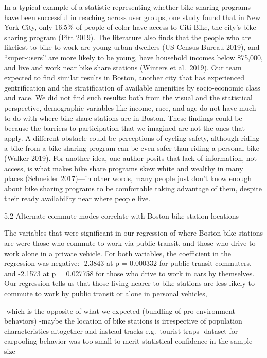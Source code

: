 \documentclass[
  12pt,
]{article}
\begin{document}
In a typical example of a statistic representing whether bike sharing
programs have been successful in reaching across user groups, one study
found that in New York City, only 16.5\% of people of color have access
to Citi Bike, the city's bike sharing program (Pitt 2019). The
literature also finds that the people who are likeliest to bike to work
are young urban dwellers (US Census Bureau 2019), and ``super-users''
are more likely to be young, have household incomes below \$75,000, and
live and work near bike share stations (Winters et al.~2019). Our team
expected to find similar results in Boston, another city that has
experienced gentrification and the stratification of available amenities
by socio-economic class and race. We did not find such results: both
from the visual and the statistical perspective, demographic variables
like income, race, and age do not have much to do with where bike share
stations are in Boston. These findings could be because the barriers to
participation that we imagined are not the ones that apply. A different
obstacle could be perceptions of cycling safety, although riding a bike
from a bike sharing program can be even safer than riding a personal
bike (Walker 2019). For another idea, one author posits that lack of
information, not access, is what makes bike share programs skew white
and wealthy in many places (Schneider 2017)---in other words, many
people just don't know enough about bike sharing programs to be
comfortable taking advantage of them, despite their ready availability
near where people live.

5.2 Alternate commute modes correlate with Boston bike station locations

The variables that were significant in our regression of where Boston
bike stations are were those who commute to work via public transit, and
those who drive to work alone in a private vehicle. For both variables,
the coefficient in the regression was negative: -2.3843 at p = 0.000332
for public transit commuters, and -2.1573 at p = 0.027758 for those who
drive to work in cars by themselves. Our regression tells us that those
living nearer to bike stations are less likely to commute to work by
public transit or alone in personal vehicles,

-which is the opposite of what we expected (bundling of pro-environment
behaviors) -maybe the location of bike stations is irrespective of
population characteristics altogether and instead tracks e.g.~tourist
traps -dataset for carpooling behavior was too small to merit
statistical confidence in the sample size
\end{document}
